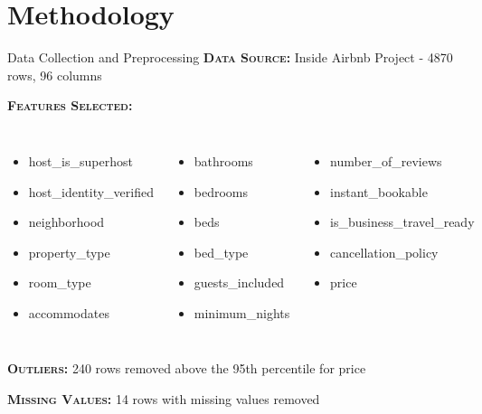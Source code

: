 \documentclass[10pt]{beamer}
\begin{document}
\section{Methodology}
	\begin{frame}{Data Collection and Preprocessing}
    	\textbf{\textsc{Data Source:}} Inside Airbnb Project - 4870 rows, 96 columns 
    	
        \textbf{\textsc{Features Selected:}}
        \fontsize{6pt}{7.2}\selectfont
    	\begin{columns}[T,onlytextwidth]
            \begin{itemize}
              	\item host\_is\_superhost
              	\item host\_identity\_verified
              	\item neighborhood
              	\item property\_type
              	\item room\_type
                \item accommodates
            \end{itemize}

          	\begin{itemize}
           		\item bathrooms
                \item bedrooms
                \item beds
                \item bed\_type
                \item guests\_included
                \item minimum\_nights
            \end{itemize}

            \begin{itemize}
              \item number\_of\_reviews
              \item instant\_bookable
              \item is\_business\_travel\_ready
              \item cancellation\_policy
              \item price
            \end{itemize}
        \end{columns}
        
        \fontsize{10pt}{7.2}\selectfont
        \textbf{\textsc{Outliers:}} 240 rows removed above the 95th percentile for price
        
        \textbf{\textsc{Missing Values:}} 14 rows  with missing values removed
    \end{frame}
    
\end{document}
